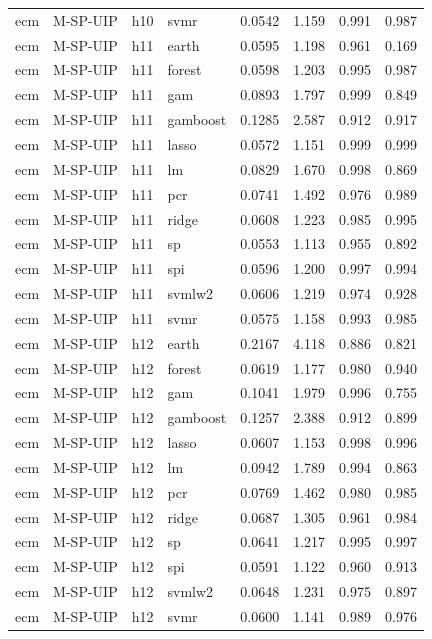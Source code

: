 \begin{ThreePartTable}
\begin{longtable}[t]{llclcccc}
ecm & M-SP-UIP & h10 & svmr & 0.0542 & 1.159 & 0.991 & 0.987\\
\addlinespace
ecm & M-SP-UIP & h11 & earth & 0.0595 & 1.198 & 0.961 & 0.169\\
ecm & M-SP-UIP & h11 & forest & 0.0598 & 1.203 & 0.995 & 0.987\\
ecm & M-SP-UIP & h11 & gam & 0.0893 & 1.797 & 0.999 & 0.849\\
ecm & M-SP-UIP & h11 & gamboost & 0.1285 & 2.587 & 0.912 & 0.917\\
ecm & M-SP-UIP & h11 & lasso & 0.0572 & 1.151 & 0.999 & 0.999\\
ecm & M-SP-UIP & h11 & lm & 0.0829 & 1.670 & 0.998 & 0.869\\
ecm & M-SP-UIP & h11 & pcr & 0.0741 & 1.492 & 0.976 & 0.989\\
ecm & M-SP-UIP & h11 & ridge & 0.0608 & 1.223 & 0.985 & 0.995\\
ecm & M-SP-UIP & h11 & sp & 0.0553 & 1.113 & 0.955 & 0.892\\
ecm & M-SP-UIP & h11 & spi & 0.0596 & 1.200 & 0.997 & 0.994\\
ecm & M-SP-UIP & h11 & svmlw2 & 0.0606 & 1.219 & 0.974 & 0.928\\
ecm & M-SP-UIP & h11 & svmr & 0.0575 & 1.158 & 0.993 & 0.985\\
\addlinespace
ecm & M-SP-UIP & h12 & earth & 0.2167 & 4.118 & 0.886 & 0.821\\
ecm & M-SP-UIP & h12 & forest & 0.0619 & 1.177 & 0.980 & 0.940\\
ecm & M-SP-UIP & h12 & gam & 0.1041 & 1.979 & 0.996 & 0.755\\
ecm & M-SP-UIP & h12 & gamboost & 0.1257 & 2.388 & 0.912 & 0.899\\
ecm & M-SP-UIP & h12 & lasso & 0.0607 & 1.153 & 0.998 & 0.996\\
ecm & M-SP-UIP & h12 & lm & 0.0942 & 1.789 & 0.994 & 0.863\\
ecm & M-SP-UIP & h12 & pcr & 0.0769 & 1.462 & 0.980 & 0.985\\
ecm & M-SP-UIP & h12 & ridge & 0.0687 & 1.305 & 0.961 & 0.984\\
ecm & M-SP-UIP & h12 & sp & 0.0641 & 1.217 & 0.995 & 0.997\\
ecm & M-SP-UIP & h12 & spi & 0.0591 & 1.122 & 0.960 & 0.913\\
ecm & M-SP-UIP & h12 & svmlw2 & 0.0648 & 1.231 & 0.975 & 0.897\\
ecm & M-SP-UIP & h12 & svmr & 0.0600 & 1.141 & 0.989 & 0.976\\

\end{longtable}
\end{ThreePartTable}
